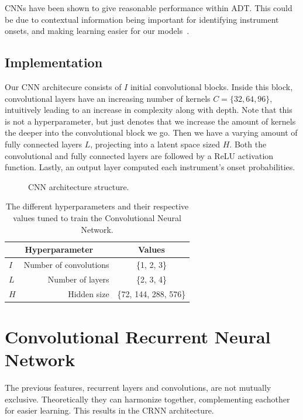 \glspl{CNN} have been shown to give reasonable performance within \gls{ADT}. This could be due to contextual information being important for identifying instrument onsets, and making learning easier for our models~\cite{Vogl2017DrumTV}.

\subsection{Implementation}

Our \gls{CNN} architecure consists of $I$ initial convolutional blocks. Inside this block, convolutional layers have an increasing number of kernels $C = \{32, 64, 96\}$, intuitively leading to an increase in complexity along with depth. Note that this is not a hyperparameter, but just denotes that we increase the amount of kernels the deeper into the convolutional block we go. Then we have a varying amount of fully connected layers $L$, projecting into a latent space sized $H$. Both the convolutional and fully connected layers are followed by a \gls{ReLU} activation function. Lastly, an output layer computed each instrument's onset probabilities.

\begin{figure}[H]
    \centering
    
    \caption{CNN architecture structure.}
    \label{CNNFigure}
\end{figure}

\begin{table}[H]
    \centering
    \begin{tabular}{lr|c}
        \multicolumn{2}{c|}{Hyperparameter} & Values       \\
        \hline
        $I$ & Number of convolutions & \{1, 2, 3\}\\
        $L$ & Number of layers      & \{2, 3, 4\} \\
        $H$ & Hidden size      & \{72, 144, 288, 576\} \\
    \end{tabular}
    \caption{The different hyperparameters and their respective values tuned to train the Convolutional Neural Network.}
    \label{CNNHyperparams}
\end{table}

\section[Convolutional RNN]{Convolutional Recurrent Neural Network}

The previous features, recurrent layers and convolutions, are not mutually exclusive. Theoretically they can harmonize together, complementing eachother for easier learning. This results in the \gls{CRNN} architecture.

